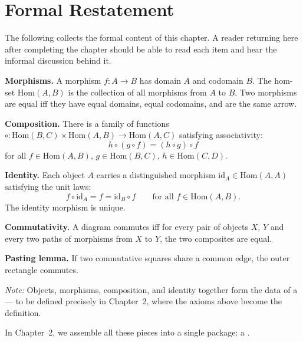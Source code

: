 \section*{Formal Restatement}
\label{sec:ch1-formal}

\begin{formalrestatement}
The following collects the formal content of this chapter. A reader returning
here after completing the chapter should be able to read each item and hear
the informal discussion behind it.

\medskip
\textbf{Morphisms.}\quad
A morphism $f : A \to B$ has domain $A$ and codomain $B$.
The hom-set $\mathrm{Hom}(A, B)$ is the collection of all morphisms from $A$
to $B$. Two morphisms are equal iff they have equal domains, equal codomains,
and are the same arrow.

\medskip
\textbf{Composition.}\quad
There is a family of functions
${\circ : \mathrm{Hom}(B,C) \times \mathrm{Hom}(A,B) \to \mathrm{Hom}(A,C)}$
satisfying associativity:
\[
  h \circ (g \circ f) = (h \circ g) \circ f
\]
for all $f \in \mathrm{Hom}(A,B)$, $g \in \mathrm{Hom}(B,C)$,
$h \in \mathrm{Hom}(C,D)$.

\medskip
\textbf{Identity.}\quad
Each object $A$ carries a distinguished morphism $\mathrm{id}_A \in
\mathrm{Hom}(A,A)$ satisfying the unit laws:
\[
  f \circ \mathrm{id}_A = f = \mathrm{id}_B \circ f
  \qquad \text{for all } f \in \mathrm{Hom}(A, B).
\]
The identity morphism is unique.

\medskip
\textbf{Commutativity.}\quad
A diagram commutes iff for every pair of objects $X$, $Y$ and every two
paths of morphisms from $X$ to $Y$, the two composites are equal.

\medskip
\textbf{Pasting lemma.}\quad
If two commutative squares share a common edge, the outer rectangle commutes.

\medskip
\noindent\textit{Note:} Objects, morphisms, composition, and identity together
form the data of a  --- to be defined precisely in Chapter~2,
where the axioms above become the definition.
\end{formalrestatement}

\bigskip

In Chapter~2, we assemble all these pieces into a single package: a
.
